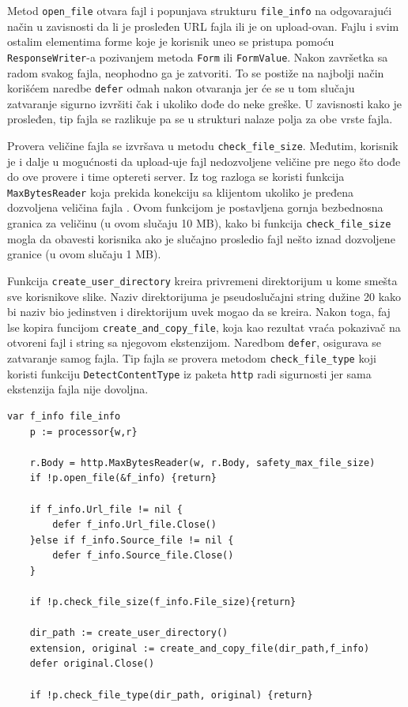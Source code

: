 \documentclass[12pt,oneside]{memoir}
\begin{document}
Metod \texttt{open\_file} otvara fajl i popunjava strukturu \texttt{file\_info} na odgovarajući način u zavisnosti da li je prosleđen URL fajla ili je on upload-ovan. Fajlu i svim ostalim elementima forme koje je korisnik uneo se pristupa pomoću \texttt{ResponseWriter}-a pozivanjem metoda \texttt{Form} ili \texttt{FormValue}. Nakon završetka sa radom svakog fajla, neophodno ga je zatvoriti. To se postiže na najbolji način korišćem naredbe \texttt{defer} odmah nakon otvaranja jer će se u tom slučaju zatvaranje sigurno izvršiti čak i ukoliko dođe do neke greške. U zavisnosti kako je prosleđen, tip fajla se razlikuje pa se u strukturi nalaze polja za obe vrste fajla. 

Provera veličine fajla se izvršava u metodu \texttt{check\_file\_size}. Međutim, korisnik je i dalje u mogućnosti da upload-uje fajl nedozvoljene veličine pre nego što dođe do ove provere i time optereti server. Iz tog razloga se koristi funkcija \texttt{MaxBytesReader} koja prekida konekciju sa klijentom ukoliko je pređena dozvoljena veličina fajla \cite{http}. Ovom funkcijom je postavljena gornja bezbednosna granica za veličinu (u ovom slučaju 10 MB), kako bi funkcija \texttt{check\_file\_size} mogla da obavesti korisnika ako je slučajno prosledio fajl nešto iznad dozvoljene granice (u ovom slučaju 1 MB). 

Funkcija \texttt{create\_user\_directory} kreira privremeni direktorijum u kome smešta sve korisnikove slike. Naziv direktorijuma je pseudoslučajni string dužine 20 kako bi naziv bio jedinstven i direktorijum uvek mogao da se kreira. Nakon toga, faj lse kopira funcijom \texttt{create\_and\_copy\_file}, koja kao rezultat vraća pokazivač na otvoreni fajl i string sa njegovom ekstenzijom. Naredbom \texttt{defer}, osigurava se zatvaranje samog fajla. Tip fajla se provera metodom  \texttt{check\_file\_type} koji koristi funkciju \texttt{DetectContentType} iz paketa \texttt{http} radi sigurnosti jer sama ekstenzija fajla nije dovoljna.

\begin{center}
\begin{lstlisting}[caption=Otvaranje i provera fajla u funkciji ImageHandler,label={lst:open},  backgroundcolor=\color{background}]
	var f_info file_info
	p := processor{w,r}

	r.Body = http.MaxBytesReader(w, r.Body, safety_max_file_size)
	if !p.open_file(&f_info) {return}

	if f_info.Url_file != nil {
		defer f_info.Url_file.Close()
	}else if f_info.Source_file != nil {
		defer f_info.Source_file.Close()
	}

	if !p.check_file_size(f_info.File_size){return}

	dir_path := create_user_directory()
	extension, original := create_and_copy_file(dir_path,f_info)
	defer original.Close()

	if !p.check_file_type(dir_path, original) {return}
\end{lstlisting}
\end{center}
 
\end{document}
